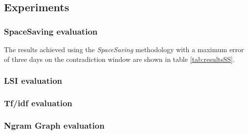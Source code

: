\subsection*{Experiments}
\subsubsection*{SpaceSaving evaluation}
The results achieved using the \emph{SpaceSaving} methodology with a maximum
error of three days on the contradiction window are shown in table
\ref{tab:resultsSS}.


\subsubsection*{LSI evaluation}


\subsubsection*{Tf/idf evaluation}

\subsubsection*{Ngram Graph evaluation}

